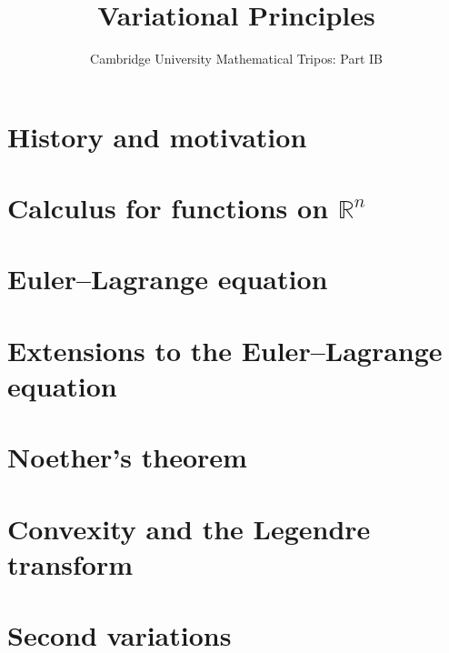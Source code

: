 \documentclass{article}
\title{Variational Principles}
\author{Cambridge University Mathematical Tripos: Part IB}
\begin{document}
\maketitle

\tableofcontentsnewpage{}

\section{History and motivation}

\section{Calculus for functions on \(\mathbb R^n\)}

\section{Euler--Lagrange equation}

\section{Extensions to the Euler--Lagrange equation}

\section{Noether's theorem}

\section{Convexity and the Legendre transform}

\section{Second variations}

\end{document}
